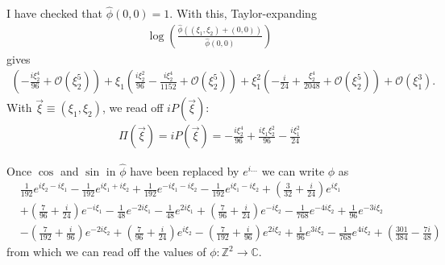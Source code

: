 \documentclass{article}
\theoremstyle{definition}
\newcommand{\nn}{\nonumber}
\newcommand{\f}[2]{\frac{#1}{#2}}
\newcommand{\lp}{\left(}
\newcommand{\rp}{\right)}
\begin{document}
I have checked that $\hat{\phi}(0,0) = 1$. With this, Taylor-expanding
\begin{align}
\log\lp \f{\hat\phi((\xi_1,\xi_2) + (0,0))}{\hat\phi(0,0)} \rp
\end{align} 
gives
\begin{align}
\left(-\frac{i  \xi_2^4}{96}+\mathcal{O}\left( \xi_2^5\right)\right)+ \xi_1 \left(\frac{i  \xi_2^2}{96}-\frac{i  \xi_2^4}{1152}+\mathcal{O}\left( \xi_2^5\right)\right)+ \xi_1^2 \left(-\frac{i}{24}+\frac{ \xi_2^4}{2048}+\mathcal{O}\left( \xi_2^5\right)\right)+\mathcal{O}\left( \xi_1^3\right).
\end{align}
With $\vec\xi \equiv (\xi_1,\xi_2)$, we read off $iP(\vec\xi)$:
\begin{align}
\boxed{\Pi(\vec{\xi}) = iP(\vec{\xi}) = -\frac{i  \xi_2^4}{96} + \frac{i \xi_1  \xi_2^2}{96} -\f{i\xi_1^2}{24} }
\end{align}

Once $\cos$ and $\sin$ in $\hat{\phi}$ have been replaced by $e^{i\dots}$ we can write $\hat\phi$ as
\begin{align}
&\frac{1}{192} e^{i \xi_2-i \xi_1} -\frac{1}{192} e^{i \xi_1+i \xi_2} +\frac{1}{192} e^{-i \xi_1-i \xi_2} -\frac{1}{192} e^{i \xi_1-i\xi_2}+\left(\frac{3}{32}+\frac{i}{24}\right) e^{i \xi_1}\nn\\
&+\left(\frac{7}{96}+\frac{i}{24}\right) e^{-i \xi_1}-\frac{1}{48} e^{-2 i \xi_1}-\frac{1}{48} e^{2 i \xi_1}+\left(\frac{7}{96}+\frac{i}{24}\right) e^{-i \xi_2}-\frac{1}{768} e^{-4 i \xi_2}+\frac{1}{96} e^{-3 i \xi_2}\nn\\
&-\left(\frac{7}{192}+\frac{i}{96}\right) e^{-2 i \xi_2}+\left(\frac{7}{96}+\frac{i}{24}\right) e^{i \xi_2}-\left(\frac{7}{192}+\frac{i}{96}\right) e^{2 i \xi_2}+\frac{1}{96} e^{3 i \xi_2}-\frac{1}{768} e^{4 i \xi_2}+\left(\frac{301}{384}-\frac{7 i}{48}\right)
\end{align}
from which we can read off the values of $\phi: \mathbb{Z}^2 \to \mathbb{C}$. 
















\newpage
\end{document}
